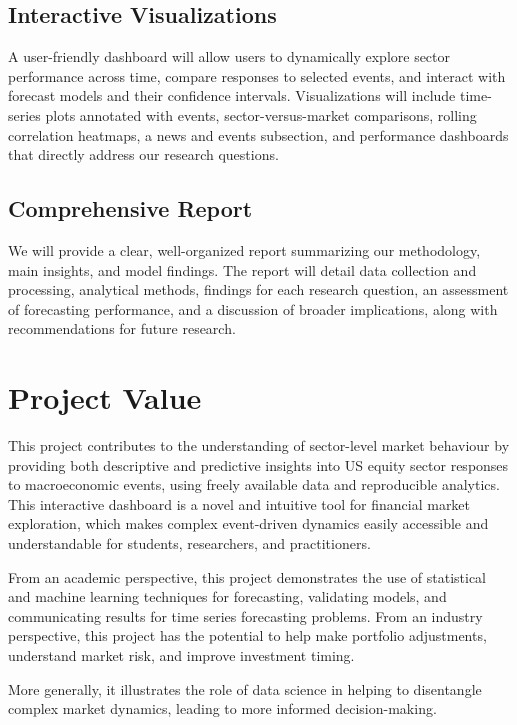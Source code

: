 \documentclass{article}
\begin{document}
\subsection{Interactive Visualizations}
A user-friendly dashboard will allow users to dynamically explore sector performance across time, compare responses to selected events, and interact with forecast models and their confidence intervals. Visualizations will include time-series plots annotated with events, sector-versus-market comparisons, rolling correlation heatmaps, a news and events subsection, and performance dashboards that directly address our research questions.

\subsection{Comprehensive Report}
We will provide a clear, well-organized report summarizing our methodology, main insights, and model findings. The report will detail data collection and processing, analytical methods, findings for each research question, an assessment of forecasting performance, and a discussion of broader implications, along with recommendations for future research.

\section{Project Value}
This project contributes to the understanding of sector-level market behaviour by providing both descriptive and predictive insights into US equity sector responses to macroeconomic events, using freely available data and reproducible analytics. This interactive dashboard is a novel and intuitive tool for financial market exploration, which makes complex event-driven dynamics easily accessible and understandable for students, researchers, and practitioners.

\vspace{0.5em}

\noindent From an academic perspective, this project demonstrates the use of statistical and machine learning techniques for forecasting, validating models, and communicating results for time series forecasting problems. From an industry perspective, this project has the potential to help make portfolio adjustments, understand market risk, and improve investment timing.

\vspace{0.5em}

\noindent More generally, it illustrates the role of data science in helping to disentangle complex market dynamics, leading to more informed decision-making.
\end{document}
